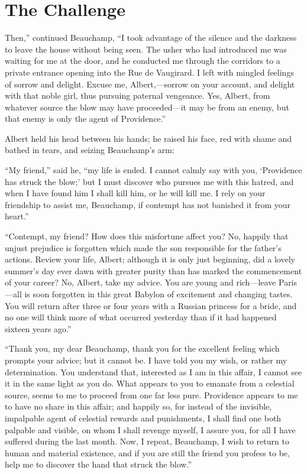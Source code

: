 \chapter{The Challenge}

Then,” continued Beauchamp, “I took advantage of the silence and the
darkness to leave the house without being seen. The usher who had
introduced me was waiting for me at the door, and he conducted me
through the corridors to a private entrance opening into the Rue de
Vaugirard. I left with mingled feelings of sorrow and delight. Excuse
me, Albert,—sorrow on your account, and delight with that noble girl,
thus pursuing paternal vengeance. Yes, Albert, from whatever source the
blow may have proceeded—it may be from an enemy, but that enemy is only
the agent of Providence.”

Albert held his head between his hands; he raised his face, red with
shame and bathed in tears, and seizing Beauchamp’s arm:

“My friend,” said he, “my life is ended. I cannot calmly say with you,
‘Providence has struck the blow;’ but I must discover who pursues me
with this hatred, and when I have found him I shall kill him, or he
will kill me. I rely on your friendship to assist me, Beauchamp, if
contempt has not banished it from your heart.”

“Contempt, my friend? How does this misfortune affect you? No, happily
that unjust prejudice is forgotten which made the son responsible for
the father’s actions. Review your life, Albert; although it is only
just beginning, did a lovely summer’s day ever dawn with greater purity
than has marked the commencement of your career? No, Albert, take my
advice. You are young and rich—leave Paris—all is soon forgotten in
this great Babylon of excitement and changing tastes. You will return
after three or four years with a Russian princess for a bride, and no
one will think more of what occurred yesterday than if it had happened
sixteen years ago.”

“Thank you, my dear Beauchamp, thank you for the excellent feeling
which prompts your advice; but it cannot be. I have told you my wish,
or rather my determination. You understand that, interested as I am in
this affair, I cannot see it in the same light as you do. What appears
to you to emanate from a celestial source, seems to me to proceed from
one far less pure. Providence appears to me to have no share in this
affair; and happily so, for instead of the invisible, impalpable agent
of celestial rewards and punishments, I shall find one both palpable
and visible, on whom I shall revenge myself, I assure you, for all I
have suffered during the last month. Now, I repeat, Beauchamp, I wish
to return to human and material existence, and if you are still the
friend you profess to be, help me to discover the hand that struck the
blow.”


